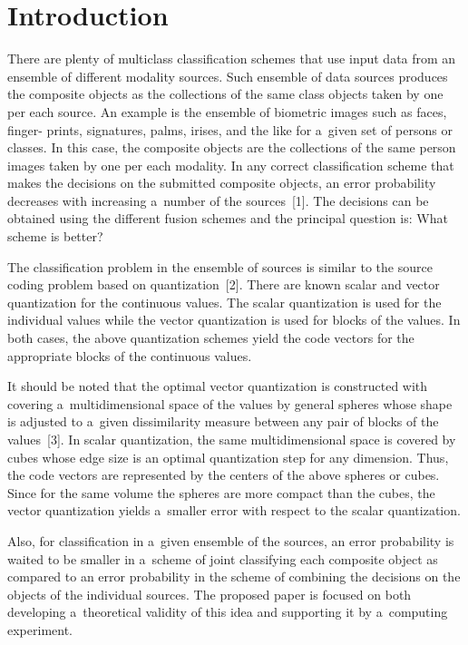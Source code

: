  \begin{multicols}{2}

 \label{st\stat}

\section{Introduction }

\noindent
There are plenty of multiclass classification schemes that use input data from an 
ensemble of different modality sources. Such ensemble of data  sources produces 
the composite objects as the collections of the same class objects taken by one per 
each source. An example is the ensemble of biometric images such as faces, finger-
prints, signatures, palms, irises, and the like for a~given set of persons or classes. In 
this case, the composite objects are the collections of the same person images taken 
by one per each modality. In any correct classification scheme that makes the 
decisions on the submitted composite objects, an error probability decreases with 
increasing a~number of the sources~[1]. The decisions can be obtained using the 
different fusion schemes and the principal question is: What scheme is better? 

      The classification problem in the ensemble of sources is similar to the source 
coding problem based on quantization~[2].  There are known scalar and vector 
quantization for the continuous values.  The scalar quantization is used for the
individual values while the vector quantization is used for blocks of the values. In 
both cases, the above quantization schemes yield the code vectors for the 
appropriate blocks of the continuous values. 
   
    It should be noted that the optimal vector quantization is constructed with 
covering a~multidimensional space of the values by general spheres whose shape is 
adjusted to a~given dissimilarity measure between any pair of blocks of the 
values~[3]. In scalar quantization, the same multidimensional space is covered by 
cubes whose edge size is an optimal quantization step for any dimension. Thus, the 
code vectors are represented by the centers of the above spheres or cubes. Since
 for the same volume the spheres are more compact than the cubes, the vector 
quantization yields a~smaller error with respect to the scalar quantization. 

Also, for classification in a~given ensemble of the sources, an error probability is 
waited to be smaller in a~scheme of joint classifying each composite object as 
compared to an error probability in the scheme of combining the decisions on the 
objects of the individual sources. The proposed paper is focused on both developing a~theoretical validity of this idea and supporting it by a~computing experiment.  
    

\end{multicols}
